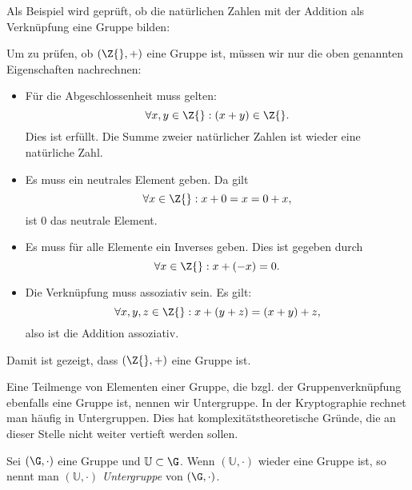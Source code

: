 Als Beispiel wird geprüft, ob die natürlichen Zahlen mit der Addition
als Verknüpfung eine Gruppe bilden:
\begin{beispiel}
  Um zu prüfen, ob \((\Z{}, +)\) eine Gruppe ist, müssen
  wir nur die oben genannten Eigenschaften nachrechnen:
  \begin{itemize}
  \item Für die Abgeschlossenheit muss gelten: 
    \[\forall x, y \in \Z{}: (x+y)\in \Z{}. \] 
     Dies ist erfüllt. Die Summe zweier natürlicher Zahlen ist wieder
     eine natürliche Zahl.
  \item Es muss ein neutrales Element geben. Da gilt 
    \[\forall x \in \Z{}: x+0 = x = 0+x, \] ist $0$ das neutrale Element.
  \item Es muss für alle Elemente ein Inverses geben. Dies ist gegeben
    durch \[\forall x \in \Z{}: x + (-x) = 0.\]
  \item Die Verknüpfung muss assoziativ sein. Es gilt:
    \[\forall x, y, z \in \Z{}: x + (y+z)=(x+y)+z,\] also ist die
    Addition assoziativ.
  \end{itemize}
  Damit ist gezeigt, dass $(\Z{}, +)$ eine Gruppe ist.
\end{beispiel}

Eine Teilmenge von Elementen einer Gruppe, die bzgl. der
Gruppenverknüpfung ebenfalls eine Gruppe ist, nennen wir Untergruppe. In
der Kryptographie rechnet man häufig in Untergruppen. Dies hat
komplexitätstheoretische Gründe, die an dieser Stelle nicht weiter
vertieft werden sollen. 

\begin{definition}[Untergruppe]
  Sei $(\G, \cdot)$ eine Gruppe und $\mathbb{U} \subset \G$. Wenn
  $(\mathbb{U}, \cdot)$ wieder eine Gruppe ist, so nennt man $(\mathbb{U},
  \cdot)$ \textit{Untergruppe} von $(\G, \cdot)$.
\end{definition}

